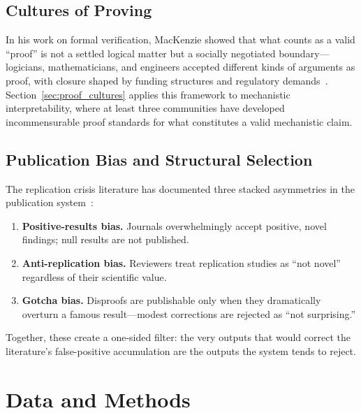 \documentclass{article}
\begin{document}
\subsection{Cultures of Proving}

In his work on formal verification, MacKenzie showed that what counts as a valid ``proof'' is not a settled logical matter but a socially negotiated boundary---logicians, mathematicians, and engineers accepted different kinds of arguments as proof, with closure shaped by funding structures and regulatory demands~\citep{mackenzie_mechanizing_2001}. Section~\ref{sec:proof_cultures} applies this framework to mechanistic interpretability, where at least three communities have developed incommensurable proof standards for what constitutes a valid mechanistic claim.

\subsection{Publication Bias and Structural Selection}

The replication crisis literature has documented three stacked asymmetries in the publication system~\citep{franco_publication_2014, simonsohn_p_curve_2014}:

\begin{enumerate}[leftmargin=*]
\item \textbf{Positive-results bias.} Journals overwhelmingly accept positive, novel findings; null results are not published.
\item \textbf{Anti-replication bias.} Reviewers treat replication studies as ``not novel'' regardless of their scientific value.
\item \textbf{Gotcha bias.} Disproofs are publishable only when they dramatically overturn a famous result---modest corrections are rejected as ``not surprising.''
\end{enumerate}

Together, these create a one-sided filter: the very outputs that would correct the literature's false-positive accumulation are the outputs the system tends to reject.

\section{Data and Methods}
\label{sec:methods}
\end{document}
